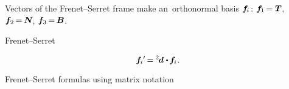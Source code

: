 \begin{otherlanguage}{russian}
Vectors of the Frenet--Serret frame make an~orthonormal basis ${\bm{f}_{\hspace{-0.1ex}i}\hspace{.2ex}}$:
${\bm{f}_{\hspace{-0.1ex}1} \hspace{-.2ex} = \bm{T}\hspace{-0.2ex}}$,
${\bm{f}_{2} \hspace{-.2ex} = \hspace{-.2ex} \bm{N}\hspace{-0.2ex}}$,
${\bm{f}_{3} \hspace{-.2ex} = \hspace{-.2ex} \bm{B}\hspace{-0.1ex}}$.

 Frenet--Serret

\nopagebreak\vspace{-0.1em}\begin{equation}\label{frenetserretformulas.tensorversion}
\bm{f}_{\hspace{-0.1ex}i}{'} \hspace{-0.25ex} = \hspace{-0.1ex} {^2\hspace{-0.2ex}\bm{d}} \hspace{.1ex} \dotp \hspace{-0.15ex} \bm{f}_{\hspace{-0.1ex}i}
\hspace{.2ex} .
\end{equation}

Frenet--Serret formulas using matrix notation


\end{otherlanguage}
